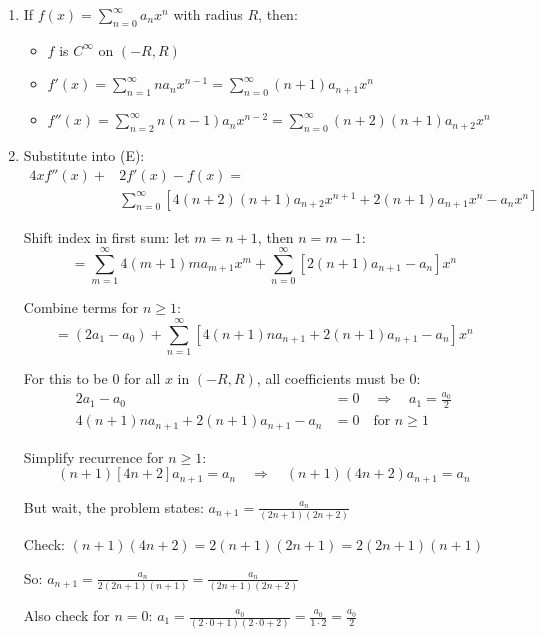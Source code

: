 \documentclass[12pt]{article}
\begin{document}
\begin{answerbox}
\begin{enumerate}
    \item If $f(x) = \sum_{n=0}^\infty a_n x^n$ with radius $R$, then:
    \begin{itemize}
        \item $f$ is $C^\infty$ on $(-R, R)$
        \item $f'(x) = \sum_{n=1}^\infty n a_n x^{n-1} = \sum_{n=0}^\infty (n+1) a_{n+1} x^n$
        \item $f''(x) = \sum_{n=2}^\infty n(n-1) a_n x^{n-2} = \sum_{n=0}^\infty (n+2)(n+1) a_{n+2} x^n$
    \end{itemize}
    
    \item Substitute into (E):
    \begin{align*}
    4x f''(x) + & 2f'(x) - f(x) = \\ 
    & \sum_{n=0}^\infty [4(n+2)(n+1) a_{n+2} x^{n+1} + 2(n+1) a_{n+1} x^n - a_n x^n]
    \end{align*}
    
    Shift index in first sum: let $m = n+1$, then $n = m-1$:
    \[
    = \sum_{m=1}^\infty 4(m+1)m a_{m+1} x^m + \sum_{n=0}^\infty [2(n+1) a_{n+1} - a_n] x^n
    \]
    
    Combine terms for $n \geq 1$:
    \[
    = (2a_1 - a_0) + \sum_{n=1}^\infty [4(n+1)n a_{n+1} + 2(n+1) a_{n+1} - a_n] x^n
    \]
    
    For this to be 0 for all $x$ in $(-R, R)$, all coefficients must be 0:
    \begin{align*}
    2a_1 - a_0 &= 0 \quad \Rightarrow \quad a_1 = \frac{a_0}{2} \\
    4(n+1)n a_{n+1} + 2(n+1) a_{n+1} - a_n &= 0 \quad \text{for } n \geq 1
    \end{align*}
    
    Simplify recurrence for $n \geq 1$:
    \[
    (n+1)[4n + 2] a_{n+1} = a_n \quad \Rightarrow \quad (n+1)(4n+2) a_{n+1} = a_n
    \]
    
    But wait, the problem states: $a_{n+1} = \frac{a_n}{(2n+1)(2n+2)}$
    
    Check: $(n+1)(4n+2) = 2(n+1)(2n+1) = 2(2n+1)(n+1)$
    
    So: $a_{n+1} = \frac{a_n}{2(2n+1)(n+1)} = \frac{a_n}{(2n+1)(2n+2)}$
    
    Also check for $n=0$: $a_1 = \frac{a_0}{(2\cdot0+1)(2\cdot0+2)} = \frac{a_0}{1\cdot 2} = \frac{a_0}{2}$ 
    

\end{enumerate}
\end{answerbox}
\end{document}
